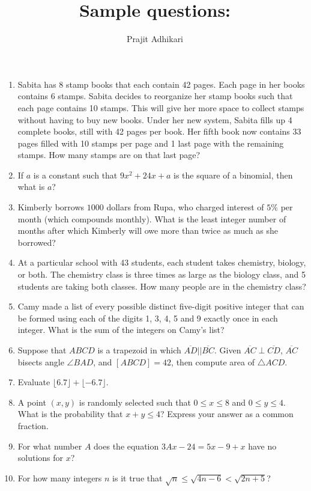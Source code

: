\documentclass{article}
\begin{document}
\title{Sample questions:}
\author{Prajit Adhikari}
\maketitle

\begin{enumerate}
    \item Sabita has 8 stamp books that each contain 42 pages. Each page in her books contains 6 stamps. Sabita decides to reorganize her stamp books such that each page contains 10 stamps. This will give her more space to collect stamps without having to buy new books. Under her new system, Sabita fills up 4 complete books, still with 42 pages per book. Her fifth book now contains 33 pages filled with 10 stamps per page and 1 last page with the remaining stamps. How many stamps are on that last page?
    \item If $a$ is a constant such that $9x^2 + 24x + a$ is the square of a binomial, then what is $a$? 
    \item Kimberly borrows $1000$ dollars from Rupa, who charged interest of $5\%$ per month (which compounds monthly). What is the least integer number of months after which Kimberly will owe more than twice as much as she borrowed? 
    \item At a particular school with 43 students, each student takes chemistry, biology, or both. The chemistry class is three times as large as the biology class, and 5 students are taking both classes. How many people are in the chemistry class? 
    \item Camy made a list of every possible distinct five-digit positive integer that can be formed using each of the digits 1, 3, 4, 5 and 9 exactly once in each integer. What is the sum of the integers on Camy's list? 
    \item Suppose that $ABCD$ is a trapezoid in which $\overline{AD}|| \overline{BC}$. Given $\overline{AC}\perp\overline{CD}$, $\overline{AC}$ bisects angle $\angle BAD$, and $[ABCD]=42$, then compute area of $\triangle ACD$.
    \item Evaluate $\lfloor6.7\rfloor+\lfloor-6.7\rfloor$.
    \item A point $(x,y)$ is randomly selected such that $0 \le x \le 8$ and $0 \le y \le 4$. What is the probability that $x+y \le 4$? Express your answer as a common fraction. 
    \item For what number $A$ does the equation $3Ax - 24 = 5x - 9 + x$ have no solutions for $x$? 
    \item For how many integers $n$ is it true that $\sqrt{n} \le \sqrt{4n - 6} < \sqrt{2n + 5}$? 

\end{enumerate}
\end{document}

